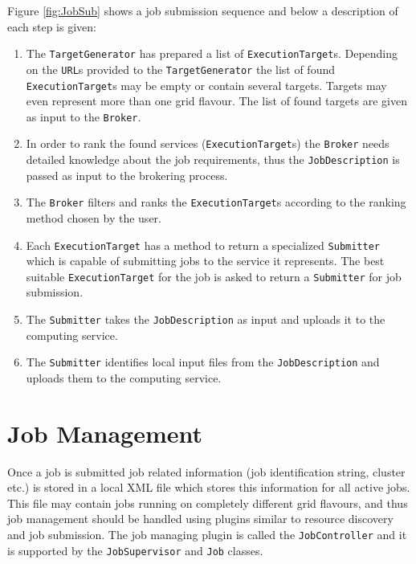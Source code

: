 \documentclass{book}
\newcommand{\Broker}{\texttt{Broker}}
\newcommand{\ExecutionTarget}{\texttt{ExecutionTarget}}
\newcommand{\Job}{\texttt{Job}}
\newcommand{\JobController}{\texttt{JobController}}
\newcommand{\JobDescription}{\texttt{JobDescription}}
\newcommand{\JobSupervisor}{\texttt{JobSupervisor}}
\newcommand{\TargetGenerator}{\texttt{TargetGenerator}}
\newcommand{\Submitter}{\texttt{Submitter}}
\newcommand{\URL}{\texttt{URL}}
\begin{document}
Figure \ref{fig:JobSub} shows a job submission sequence and below a
description of each step is given:

\begin{enumerate}
\item{The {\TargetGenerator} has prepared a list of
  {\ExecutionTarget}s. Depending on the {\URL}s provided to the
  {\TargetGenerator} the list of found {\ExecutionTarget}s may be
  empty or contain several targets. Targets may even represent more
  than one grid flavour. The list of found targets are given as input
  to the {\Broker}.}
\item{In order to rank the found services ({\ExecutionTarget}s) the
  {\Broker} needs detailed knowledge about the job requirements, thus
  the {\JobDescription} is passed as input to the brokering process.}
\item{The {\Broker} filters and ranks the {\ExecutionTarget}s according 
  to the ranking method chosen by the user.}
\item{Each {\ExecutionTarget} has a method to return a specialized
  {\Submitter} which is capable of submitting jobs to the service it
  represents. The best suitable {\ExecutionTarget} for the job is
  asked to return a {\Submitter} for job submission.}
\item{The {\Submitter} takes the {\JobDescription} as input and
  uploads it to the computing service.}
\item{The {\Submitter} identifies local input files from the
  {\JobDescription} and uploads them to the computing service.}
\end{enumerate}

\section{Job Management}

Once a job is submitted job related information (job identification
string, cluster etc.) is stored in a local XML file which stores this 
information for all active jobs. This file may contain jobs running on
completely different grid flavours, and thus job management should be
handled using plugins similar to resource discovery and job
submission. The job managing plugin is called the {\JobController} and
it is supported by the {\JobSupervisor} and {\Job} classes.
\end{document}
